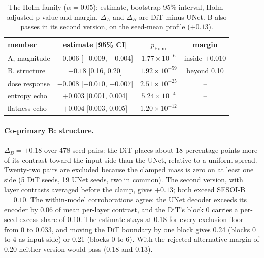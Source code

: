 \documentclass{article}
\begin{document}
\begin{table}[t]
  \caption{The Holm family ($\alpha{=}0.05$): estimate, bootstrap 95\% interval, Holm-adjusted p-value and margin. $\Delta_A$ and $\Delta_B$ are DiT minus UNet. B also passes in its second version, on the seed-mean profile ($+0.13$).}
  \label{tab:family}
  \centering
  \begin{small}
    \begin{tabular}{lccc}
      \toprule
      member & estimate [95\% CI] & $p_{\mathrm{Holm}}$ & margin \\
      \midrule
      A, magnitude  & $-0.006$ [$-0.009$, $-0.004$] & $1.77{\times}10^{-6}$ & inside $\pm 0.010$ \\
      B, structure  & $+0.18$ [0.16, 0.20] & $1.92{\times}10^{-59}$ & beyond 0.10 \\
      dose response & $-0.008$ [$-0.010$, $-0.007$] & $2.51{\times}10^{-25}$ & -- \\
      entropy echo  & $+0.003$ [0.001, 0.004] & $5.24{\times}10^{-4}$ & -- \\
      flatness echo & $+0.004$ [0.003, 0.005] & $1.20{\times}10^{-12}$ & -- \\
      \bottomrule
    \end{tabular}
  \end{small}
  \vspace{-0.3cm}
\end{table}

\paragraph{Co-primary B: structure.} $\Delta_B = +0.18$ over 478 seed pairs: the DiT places about 18 percentage points more of its contrast toward the input side than the UNet, relative to a uniform spread. Twenty-two pairs are excluded because the clamped mass is zero on at least one side (5 DiT seeds, 19 UNet seeds, two in common). The second version, with layer contrasts averaged before the clamp, gives $+0.13$; both exceed SESOI-B $= 0.10$. The within-model corroborations agree: the UNet decoder exceeds its encoder by 0.06 of mean per-layer contrast, and the DiT's block 0 carries a per-seed excess share of 0.10. The estimate stays at 0.18 for every exclusion floor from 0 to 0.033, and moving the DiT boundary by one block gives 0.24 (blocks 0 to 4 as input side) or 0.21 (blocks 0 to 6). With the rejected alternative margin of 0.20 neither version would pass (0.18 and 0.13).
\end{document}
